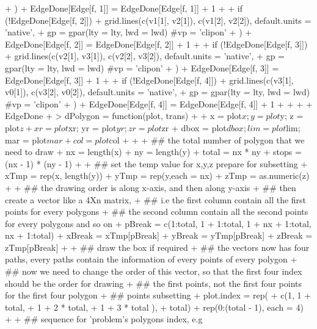 \documentclass[paper=a4, fontsize=11pt]{report}
\begin{document}
\begin{Schunk}
\begin{Sinput}
{{{{+                     )
+                 EdgeDone[Edge[f, 1]] = EdgeDone[Edge[f, 1]] + 1
+                 }
+             if (!EdgeDone[Edge[f, 2]]){
+                 grid.lines(c(v1[1], v2[1]), c(v1[2], v2[2]), default.units = 'native',
+                     gp = gpar(lty = lty, lwd = lwd) #vp = 'clipon'
+                     )
+                 EdgeDone[Edge[f, 2]] = EdgeDone[Edge[f, 2]] + 1
+                 }
+             if (!EdgeDone[Edge[f, 3]]){
+                 grid.lines(c(v2[1], v3[1]), c(v2[2], v3[2]), default.units = 'native',
+                     gp = gpar(lty = lty, lwd = lwd) #vp = 'clipon'
+                     )
+                 EdgeDone[Edge[f, 3]] = EdgeDone[Edge[f, 3]] + 1
+                 }
+             if (!EdgeDone[Edge[f, 4]]){
+                 grid.lines(c(v3[1], v0[1]), c(v3[2], v0[2]), default.units = 'native',
+                     gp = gpar(lty = lty, lwd = lwd) #vp = 'clipon'
+                     )
+                 EdgeDone[Edge[f, 4]] = EdgeDone[Edge[f, 4]] + 1
+                 }
+         }
+     }
+     EdgeDone
+ }
> dPolygon = function(plot, trans){
+ 
+     x = plot$x; y = plot$y; z = plot$z
+     xr = plot$xr; yr = plot$yr; zr = plot$zr
+     dbox = plot$dbox; lim = plot$lim; mar = plot$mar
+     col = plot$col
+         
+ 
+     ## the total number of polygon that we need to draw	
+ 	nx = length(x)
+ 	ny = length(y)
+     total = nx * ny
+ 	stops = (nx - 1) * (ny - 1)
+ 
+     ## set the temp value for x,y,z prepare for subsetting
+     xTmp = rep(x, length(y))
+     yTmp = rep(y,each = nx)
+     zTmp = as.numeric(z)
+     
+     ## the drawing order is along x-axis, and then along y-axis
+     ## then create a vector like a 4Xn matrix, 
+     ## i.e the first column contain all the first points for every polygons
+     ## the second column contain all the second points for every polygons and so on 
+     pBreak = c(1:total, 1 + 1:total, 1 + nx + 1:total, nx + 1:total)
+     xBreak = xTmp[pBreak]
+     yBreak = yTmp[pBreak]
+     zBreak = zTmp[pBreak]
+     
+     ## draw the box if required
+     ## the vectors now has four paths, every paths contain the information of every points of every polygon
+     ## now we need to change the order of this vector, so that the first four index should be the order for drawing 
+     ## the first points, not the first four points for the first four polygon
+     ## points subsetting 
+     plot.index = rep(
+         c(1, 1 + total, 
+         1 + 2 * total, 
+         1 + 3 * total ),
+         total) + rep(0:(total - 1), each = 4)
+ 
+     ## sequence for 'problem's polygons index, e.g
}
\end{Sinput}
\end{Schunk}
\end{document}
